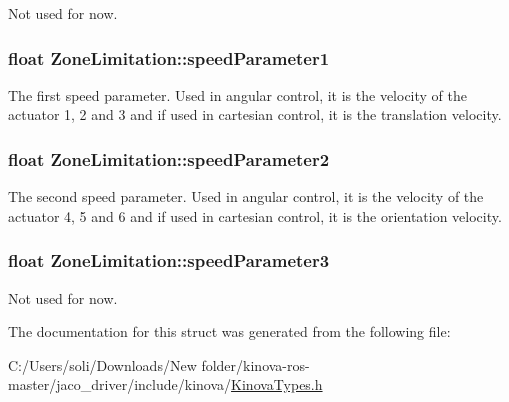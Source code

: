 Not used for now. 

\subsubsection[{\texorpdfstring{speed\+Parameter1}{speedParameter1}}]{\setlength{\rightskip}{0pt plus 5cm}float Zone\+Limitation\+::speed\+Parameter1}\hypertarget{struct_zone_limitation_ad950b4fb26e50ef944208963fac5ed6a}{}\label{struct_zone_limitation_ad950b4fb26e50ef944208963fac5ed6a}


The first speed parameter. Used in angular control, it is the velocity of the actuator 1, 2 and 3 and if used in cartesian control, it is the translation velocity. 

\subsubsection[{\texorpdfstring{speed\+Parameter2}{speedParameter2}}]{\setlength{\rightskip}{0pt plus 5cm}float Zone\+Limitation\+::speed\+Parameter2}\hypertarget{struct_zone_limitation_a16a15e3160b4447b38b7c9d40ef88305}{}\label{struct_zone_limitation_a16a15e3160b4447b38b7c9d40ef88305}


The second speed parameter. Used in angular control, it is the velocity of the actuator 4, 5 and 6 and if used in cartesian control, it is the orientation velocity. 

\subsubsection[{\texorpdfstring{speed\+Parameter3}{speedParameter3}}]{\setlength{\rightskip}{0pt plus 5cm}float Zone\+Limitation\+::speed\+Parameter3}\hypertarget{struct_zone_limitation_a6db5f0c7f4a59fae6871ec518a7dc9c2}{}\label{struct_zone_limitation_a6db5f0c7f4a59fae6871ec518a7dc9c2}


Not used for now. 



The documentation for this struct was generated from the following file\+:\begin{DoxyCompactItemize}
\item 
C\+:/\+Users/soli/\+Downloads/\+New folder/kinova-\/ros-\/master/jaco\+\_\+driver/include/kinova/\hyperlink{_kinova_types_8h}{Kinova\+Types.\+h}\end{DoxyCompactItemize}
